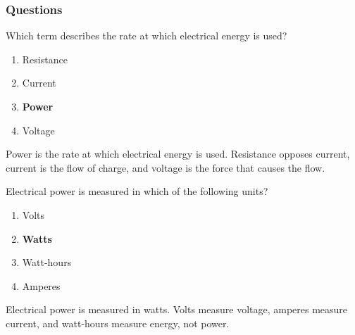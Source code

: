\subsubsection*{Questions}


\begin{tcolorbox}[colback=gray!10!white,colframe=black!75!black,title={T5A10}]
    Which term describes the rate at which electrical energy is used?
    \begin{enumerate}[label=\Alph*),noitemsep]
        \item Resistance
        \item Current
        \item \textbf{Power}
        \item Voltage
    \end{enumerate}
\end{tcolorbox}
Power is the rate at which electrical energy is used. Resistance opposes current, current is the flow of charge, and voltage is the force that causes the flow.

\begin{tcolorbox}[colback=gray!10!white,colframe=black!75!black,title={T5A02}]
    Electrical power is measured in which of the following units?
    \begin{enumerate}[label=\Alph*),noitemsep]
        \item Volts
        \item \textbf{Watts}
        \item Watt-hours
        \item Amperes
    \end{enumerate}
    \end{tcolorbox}
    Electrical power is measured in watts. Volts measure voltage, amperes measure current, and watt-hours measure energy, not power.
    